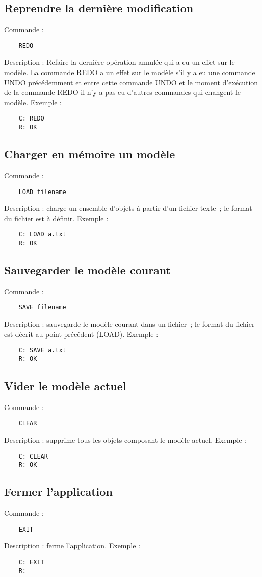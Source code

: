 \documentclass[oneside]{book}
\begin{document}
\subsection*{Reprendre la dernière modification}
Commande : 
\begin{lstlisting}
	REDO
\end{lstlisting}
Description : Refaire la dernière opération annulée qui a eu un effet sur le modèle. La commande REDO a un effet sur le modèle s'il y a eu une commande UNDO précédemment et entre cette commande UNDO et le moment d'exécution de la commande REDO il n'y a pas eu d'autres commandes qui changent le modèle.\newline
Exemple :
\begin{lstlisting}
	C: REDO
	R: OK
\end{lstlisting}

\subsection*{Charger en mémoire un modèle}
 Commande : 
\begin{lstlisting}
	LOAD filename
\end{lstlisting}
Description : charge un ensemble d'objets à partir d'un fichier texte~; le format du fichier est à définir.\newline
Exemple :
\begin{lstlisting}
	C: LOAD a.txt
	R: OK
\end{lstlisting}

\subsection*{Sauvegarder le modèle courant}
Commande : 
\begin{lstlisting}
	SAVE filename
\end{lstlisting}
Description : sauvegarde le modèle courant dans un fichier~; le format du fichier est décrit au point précédent (LOAD).\newline
Exemple :
\begin{lstlisting}
	C: SAVE a.txt
	R: OK
\end{lstlisting}

\subsection*{Vider le modèle actuel}
Commande : 
\begin{lstlisting}
	CLEAR
\end{lstlisting}
Description : supprime tous les objets composant le modèle actuel.\newline
Exemple : 
\begin{lstlisting}
	C: CLEAR
	R: OK
\end{lstlisting}

\subsection*{Fermer l'application}
Commande : 
\begin{lstlisting}
	EXIT
\end{lstlisting}
Description : ferme l'application.\newline
Exemple :
\begin{lstlisting}
	C: EXIT
	R: 
\end{lstlisting}
\end{document}

